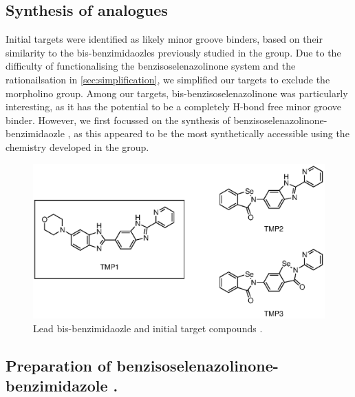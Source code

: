 \begin{refsection}
\section{Synthesis of analogues}
Initial targets  were identified as likely minor groove binders, based on their similarity to the bis-benzimidaozles previously studied in the group.
Due to the difficulty of functionalising the benzisoselenazolinone system and the rationailsation in \cref{sec:simplification}, we simplified our targets to exclude the morpholino group.
Among our targets, bis-benzisoselenazolinone  was particularly interesting, as it has the potential to be a completely H-bond free minor groove binder.
However, we first focussed on the synthesis of benzisoselenazolinone-benzimidaozle , as this appeared to be the most synthetically accessible using the chemistry developed in the group.

\begin{figure}
    \centering
    \includegraphics[scale=0.74]{Figures/targets.eps}
    \caption{Lead bis-benzimidaozle  and initial target compounds .}
    \label{fig:targets}
\end{figure}

\subsection{Preparation of benzisoselenazolinone-benzimidazole .}


\end{refsection}
